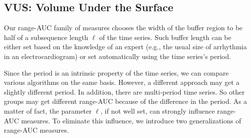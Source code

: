 \subsection{VUS: Volume Under the Surface}
\label{sec:vus}

Our range-AUC family of measures chooses the width of the buffer region to be half of a subsequence length $\ell$ of the time series. Such buffer length can be either set based on the knowledge of an expert (e.g., the usual size of arrhythmia in an electrocardiogram) or set automatically using the time series's period.  

Since the period is an intrinsic property of the time series, we can compare various algorithms on the same basis. However, a different approach may get a slightly different period. In addition, there are multi-period time series. So other groups may get different range-AUC because of the difference in the period. As a matter of fact, the parameter $\ell$, if not well set, can strongly influence range-AUC measures. To eliminate this influence, we introduce two generalizations of range-AUC measures.

